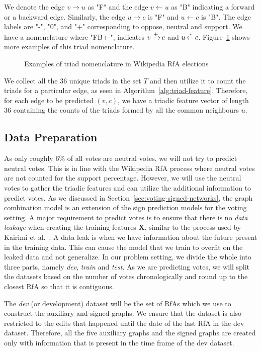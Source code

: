We denote the edge $v \rightarrow u$ as "F" and the edge $v \leftarrow u$ as "B" indicating a forward or a backward edge.
Similarly, the edge $u \rightarrow c$ is "F" and $u \leftarrow c$ is "B".
The edge labels are "-", "0", and "+" corresponding to oppose, neutral and support.
We have a nomenclature where "FB+-", indicates $v\operatorname*{\xrightarrow{+}} c$ and $u \operatorname*{\xleftarrow{-}} c$.
Figure~\ref{fig:triad-naming} shows more examples of this triad nomenclature.

\begin{figure}[htp]
    \centering
    
    \caption{Examples of triad nomenclature in Wikipedia RfA elections }
    \label{fig:triad-naming}
\end{figure}
We collect all the 36 unique triads in the set $T$ and then utilize it to count the triads for a particular edge, as seen in Algorithm~\ref{alg:triad-feature}.
Therefore, for each edge to be predicted $(v,c)$, we have a triadic feature vector of length 36 containing the counts of the triads formed by all the common neighbours $u$.  

\subsection{Data Preparation}
As only roughly $6\%$ of all votes are neutral votes, we will not try to predict neutral votes.
This is in line with the Wikipedia RfA process where neutral votes are not counted for the support percentage. 
However, we will use the neutral votes to gather the triadic features and can utilize the additional information to predict votes.
As we discussed in Section~\ref{sec:voting-signed-networks}, the graph combination model is an extension of the sign prediction models for the voting setting.
A major requirement to predict votes is to ensure that there is no \textit{data leakage} when creating the training features $\mathbf{X}$, similar to the process used by Kairimi et al.\ \cite{karimi2019multicongress}.
A data leak is when we have information about the future present in the training data.
This can cause the model that we train to overfit on the leaked data and not generalize.
In our problem setting, we divide the whole \wikirfa into three parts, namely \textit{dev}, \textit{train} and \textit{test}.
As we are predicting votes, we will split the datasets based on the number of votes chronologically and round up to the closest RfA so that it is contiguous. 

The \textit{dev} (or development) dataset will be the set of RfAs which we use to construct the auxiliary and signed graphs.
We ensure that the \usercontrib dataset is also restricted to the edits that happened until the date of the last RfA in the dev dataset.
Therefore, all the five auxiliary graphs and the signed graphs are created only with information that is present in the time frame of the dev dataset.

